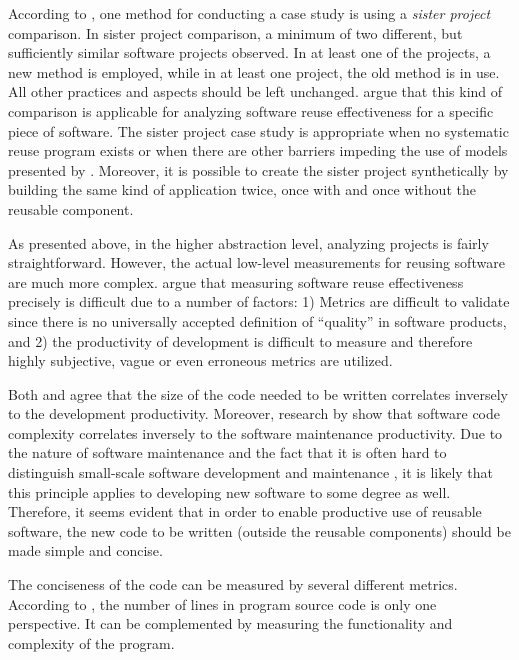 According to \citet{kitchenham_evaluating_1998}, one method for conducting a case study is using a \emph{sister project} comparison. In sister project comparison, a minimum of two different, but sufficiently similar software projects observed. In at least one of the projects, a new method is employed, while in at least one project, the old method is in use. All other practices and aspects should be left unchanged. \citet{mohagheghi_quality_2007} argue that this kind of comparison is applicable for analyzing software reuse effectiveness for a specific piece of software. The sister project case study is appropriate when no systematic reuse program exists or when there are other barriers impeding the use of models presented by \citet{frakes_software_1996}. Moreover, it is possible to create the sister project synthetically by building the same kind of application twice, once with and once without the reusable component.

As presented above, in the higher abstraction level, analyzing projects is fairly straightforward. However, the actual low-level measurements for reusing software are much more complex. \citet{mohagheghi_quality_2007} argue that measuring software reuse effectiveness precisely is difficult due to a number of factors: 1) Metrics are difficult to validate since there is no universally accepted definition of ``quality'' in software products, and 2) the productivity of development is difficult to measure and therefore highly subjective, vague or even erroneous metrics are utilized.

Both \citet{frakes_software_1996} and \citet{mohagheghi_quality_2007} agree that the size of the code needed to be written correlates inversely to the development productivity. Moreover, research by \citet{banker_software_1993,gill_cyclomatic_1991} show that software code complexity correlates inversely to the software maintenance productivity. Due to the nature of software maintenance and the fact that it is often hard to distinguish small-scale software development and maintenance \citep{chapin_types_2001}, it is likely that this principle applies to developing new software to some degree as well. Therefore, it seems evident that in order to enable productive use of reusable software, the new code to be written (outside the reusable components) should be made simple and concise.

The conciseness of the code can be measured by several different metrics. According to \citet{fenton_software_1998}, the number of lines in program source code is only one perspective. It can be complemented by measuring the functionality and complexity of the program.

